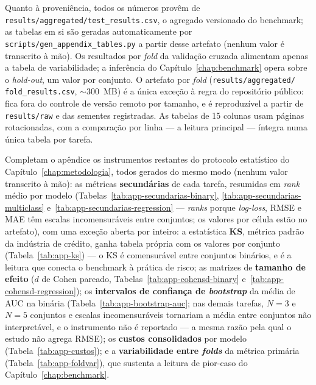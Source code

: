 Quanto à proveniência, todos os números
provêm de
\texttt{results/\allowbreak aggregated/\allowbreak test\_\allowbreak results.\allowbreak csv}, o agregado versionado
do benchmark; as tabelas em si são geradas automaticamente por
\texttt{scripts/\allowbreak gen\_\allowbreak appendix\_\allowbreak tables.\allowbreak py} a partir desse artefato
(nenhum valor é transcrito à mão). Os resultados por \emph{fold} da validação cruzada alimentam apenas
a tabela de variabilidade; a inferência do
Capítulo~\ref{chap:benchmark} opera sobre o \emph{hold-out}, um
valor por conjunto. O artefato por \emph{fold}
(\texttt{results/\allowbreak aggregated/\allowbreak
fold\_\allowbreak results.\allowbreak csv}, $\sim$300~MB) é a única
exceção à regra do repositório público: fica fora do controle de
versão remoto por tamanho, e é reproduzível a partir de
\texttt{results/raw} e das sementes registradas. As tabelas de 15
colunas usam páginas rotacionadas, com a comparação por linha ---
a leitura principal --- íntegra numa única tabela por tarefa.

Completam o apêndice os instrumentos restantes do protocolo
estatístico do Capítulo~\ref{chap:metodologia}, todos gerados do mesmo
modo (nenhum valor transcrito à mão): as métricas
\textbf{secundárias} de cada tarefa, resumidas em \emph{rank} médio
por modelo (Tabelas~\ref{tab:app-secundarias-binary},
\ref{tab:app-secundarias-multiclass}
e~\ref{tab:app-secundarias-regression} --- \emph{ranks} porque
\emph{log-loss}, RMSE e MAE têm escalas incomensuráveis entre
conjuntos; os valores por célula estão no artefato), com uma exceção
aberta por inteiro: a estatística \textbf{KS}, métrica padrão da
indústria de crédito, ganha tabela própria com os valores por conjunto
(Tabela~\ref{tab:app-ks}) --- o KS é comensurável entre conjuntos
binários, e é a leitura que conecta o benchmark à prática de risco; as
matrizes de
\textbf{tamanho de efeito} ($d$ de Cohen pareado,
Tabelas~\ref{tab:app-cohensd-binary}
e~\ref{tab:app-cohensd-regression}); os \textbf{intervalos de
confiança de \emph{bootstrap}} da média de AUC na binária
(Tabela~\ref{tab:app-bootstrap-auc}; nas demais tarefas, $N{=}3$ e
$N{=}5$ conjuntos e escalas incomensuráveis tornariam a média entre
conjuntos não interpretável, e o instrumento não é reportado --- a
mesma razão pela qual o estudo não agrega RMSE); os \textbf{custos
consolidados} por modelo (Tabela~\ref{tab:app-custos}); e a
\textbf{variabilidade entre \emph{folds}} da métrica primária
(Tabela~\ref{tab:app-foldvar}), que sustenta a leitura de pior-caso do
Capítulo~\ref{chap:benchmark}.

